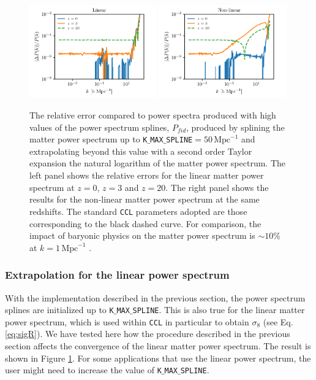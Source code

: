 \documentclass[\docopts]{\docclass}
\newcommand{\ccl}{{\tt CCL}\xspace}
\begin{document}
\begin{figure}
\centering
  \includegraphics[width=0.49\textwidth]{splacc_power_lin}
  \includegraphics[width=0.49\textwidth]{splacc_power_nl}
\caption{The relative error compared to power spectra produced with high values of the power spectrum splines, $P_{fid}$, produced by splining the matter power spectrum up to {\tt K$\_$MAX$\_$SPLINE}$=50\,\text{Mpc}^{-1}$ and extrapolating beyond this value with a second order Taylor expansion the natural logarithm of the matter power spectrum. The left panel shows the relative errors for the linear matter power spectrum at $z=0$, $z=3$ and $z=20$. The right panel shows the results for the non-linear matter power spectrum at the same redshifts. The standard \ccl parameters adopted are those corresponding to the black dashed curve. For comparison, the impact of baryonic physics on the matter power spectrum is $\sim 10\%$ at $k=1\,\text{Mpc}^{-1}$ \citep{Schneider15}.}
\label{fig:NLextrapol}
\end{figure}

\subsubsection{Extrapolation for the linear power spectrum}
\label{sec:Lextrapol}

With the implementation described in the previous section, the power spectrum splines are initialized up to {\tt K$\_$MAX$\_$SPLINE}. This is also true for the linear matter power spectrum, which is used within \ccl in particular to obtain $\sigma_8$ (see Eq. \ref{eq:sigR}). We have tested here how the procedure described in the previous section affects the convergence of the linear matter power spectrum. The result is shown in Figure \ref{fig:NLextrapol}. For some applications that use the linear power spectrum, the user might need to increase the value of {\tt K$\_$MAX$\_$SPLINE}.
\end{document}
